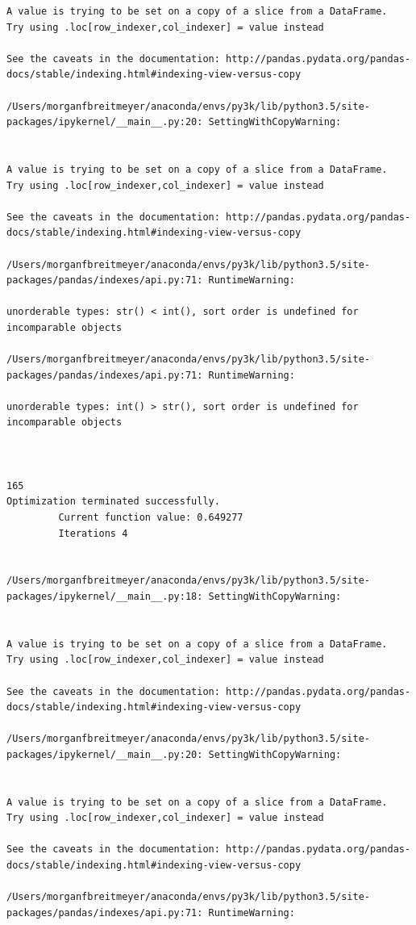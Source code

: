 \begin{lstlisting}
A value is trying to be set on a copy of a slice from a DataFrame.
Try using .loc[row_indexer,col_indexer] = value instead

See the caveats in the documentation: http://pandas.pydata.org/pandas-docs/stable/indexing.html#indexing-view-versus-copy

/Users/morganfbreitmeyer/anaconda/envs/py3k/lib/python3.5/site-packages/ipykernel/__main__.py:20: SettingWithCopyWarning:


A value is trying to be set on a copy of a slice from a DataFrame.
Try using .loc[row_indexer,col_indexer] = value instead

See the caveats in the documentation: http://pandas.pydata.org/pandas-docs/stable/indexing.html#indexing-view-versus-copy

/Users/morganfbreitmeyer/anaconda/envs/py3k/lib/python3.5/site-packages/pandas/indexes/api.py:71: RuntimeWarning:

unorderable types: str() < int(), sort order is undefined for incomparable objects

/Users/morganfbreitmeyer/anaconda/envs/py3k/lib/python3.5/site-packages/pandas/indexes/api.py:71: RuntimeWarning:

unorderable types: int() > str(), sort order is undefined for incomparable objects



165
Optimization terminated successfully.
         Current function value: 0.649277
         Iterations 4


/Users/morganfbreitmeyer/anaconda/envs/py3k/lib/python3.5/site-packages/ipykernel/__main__.py:18: SettingWithCopyWarning:


A value is trying to be set on a copy of a slice from a DataFrame.
Try using .loc[row_indexer,col_indexer] = value instead

See the caveats in the documentation: http://pandas.pydata.org/pandas-docs/stable/indexing.html#indexing-view-versus-copy

/Users/morganfbreitmeyer/anaconda/envs/py3k/lib/python3.5/site-packages/ipykernel/__main__.py:20: SettingWithCopyWarning:


A value is trying to be set on a copy of a slice from a DataFrame.
Try using .loc[row_indexer,col_indexer] = value instead

See the caveats in the documentation: http://pandas.pydata.org/pandas-docs/stable/indexing.html#indexing-view-versus-copy

/Users/morganfbreitmeyer/anaconda/envs/py3k/lib/python3.5/site-packages/pandas/indexes/api.py:71: RuntimeWarning:


\end{lstlisting}
